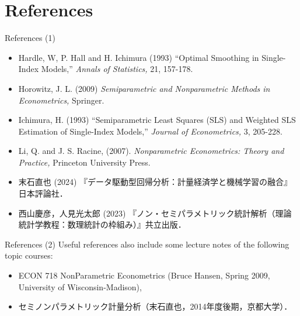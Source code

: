 \documentclass[xcolor=svgnames,dvipdfmx,cjk]{beamer}
\theoremstyle{example}
\begin{document}
  
\section{References}
  
  
\begin{frame}{References (1)}
    \begin{itemize}
      \item Hardle, W, P. Hall and H. Ichimura (1993)
            ``Optimal Smoothing in Single-Index Models,'' \textit{Annals of Statistics,} 21, 157-178.
      \item Horowitz, J. L. (2009)
            \textit{Semiparametric and Nonparametric Methods in Econometrics,}
            Springer.
      \item Ichimura, H. (1993) 
            ``Semiparametric Least Squares (SLS) and Weighted SLS Estimation of Single-Index Models,''
            \textit{Journal of Econometrics,} 3, 205-228. 
      \item Li, Q. and J. S. Racine, (2007). 
            \textit{Nonparametric Econometrics: Theory and Practice,} 
            Princeton University Press.
      \item 末石直也 (2024) 『データ駆動型回帰分析：計量経済学と機械学習の融合』日本評論社．
      \item 西山慶彦，人見光太郎 (2023) 『ノン・セミパラメトリック統計解析（理論統計学教程：数理統計の枠組み）』共立出版．
    \end{itemize}
\end{frame}


\begin{frame}{References (2)}
\quad 
Useful references also include some lecture notes of the following topic courses:
  \begin{itemize}
    \item ECON 718 NonParametric Econometrics (Bruce Hansen, Spring 2009, University of Wisconsin-Madison),
    \item セミノンパラメトリック計量分析（末石直也，2014年度後期，京都大学）．
  \end{itemize}
\end{frame}
\end{document}
